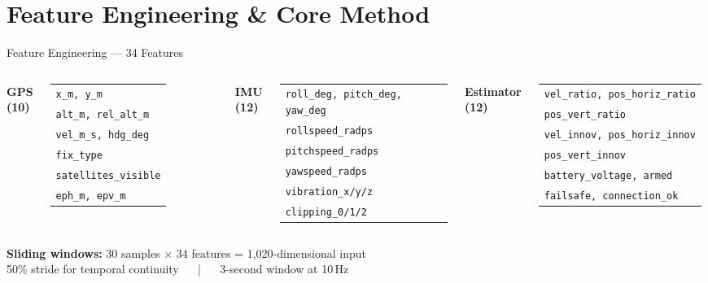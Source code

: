 \documentclass[11pt]{beamer}
\begin{document}
\section{Feature Engineering \& Core Method}
\begin{frame}{Feature Engineering — 34 Features}
\begin{columns}[T]
\centering\textbf{\small GPS (10)} \\[1mm]
\tiny
\begin{tabular}{@{}l@{}}
\texttt{x\_m, y\_m} \\
\texttt{alt\_m, rel\_alt\_m} \\
\texttt{vel\_m\_s, hdg\_deg} \\
\texttt{fix\_type} \\
\texttt{satellites\_visible} \\
\texttt{eph\_m, epv\_m} \\
\end{tabular}
\centering\textbf{\small IMU (12)} \\[1mm]
\tiny
\begin{tabular}{@{}l@{}}
\texttt{roll\_deg, pitch\_deg, yaw\_deg} \\
\texttt{rollspeed\_radps} \\
\texttt{pitchspeed\_radps} \\
\texttt{yawspeed\_radps} \\
\texttt{vibration\_x/y/z} \\
\texttt{clipping\_0/1/2} \\
\end{tabular}
\centering\textbf{\small Estimator (12)} \\[1mm]
\tiny
\begin{tabular}{@{}l@{}}
\texttt{vel\_ratio, pos\_horiz\_ratio} \\
\texttt{pos\_vert\_ratio} \\
\texttt{vel\_innov, pos\_horiz\_innov} \\
\texttt{pos\_vert\_innov} \\
\texttt{battery\_voltage, armed} \\
\texttt{failsafe, connection\_ok} \\
\end{tabular}
\end{columns}
\vspace{3mm}
\begin{center}
\small \textbf{Sliding windows:} 30 samples $\times$ 34 features = 1,020-dimensional input \\[1mm]
\small 50\% stride for temporal continuity $\quad$ | $\quad$ 3-second window at 10\,Hz
\end{center}
\end{frame}
\end{document}
